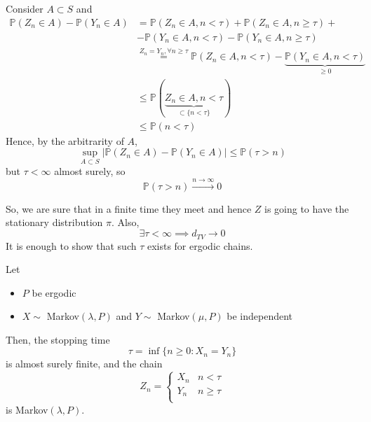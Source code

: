 \documentclass{article}
\begin{document}
	\begin{proof2}
		Consider $A \subset S$ and 
		\begin{align*}
			\mathbb{P}(Z_n \in A) - \mathbb{P}(Y_n \in A) &= \mathbb{P}(Z_n \in A, n < \tau) + \mathbb{P}(Z_n \in A, n \geq \tau) +\\
			&- \mathbb{P}(Y_n \in A, n < \tau) - \mathbb{P}(Y_n \in A, n \geq \tau) \\
			&\stackrel{Z_n = Y_n, \forall n \geq \tau}= \mathbb{P}(Z_n \in A, n < \tau)- \underbrace{\mathbb{P}(Y_n \in A, n < \tau)}_{\geq 0} \\
			&\leq \mathbb{P}(\underbrace{Z_n \in A, n < \tau}_{\subset \{n < \tau\}})\\
			&\leq \mathbb{P}(n < \tau)
		\end{align*}
		Hence, by the arbitrarity of $A$,
		\begin{equation*}
			\sup_{A \subset S} |\mathbb{P}(Z_n \in A) - \mathbb{P}(Y_n \in A)| \leq \mathbb{P}(\tau > n)
		\end{equation*}
		but $\tau < \infty$ almost surely, so
		\begin{equation*}
			\mathbb{P}(\tau > n) \xrightarrow{n \rightarrow \infty} 0
		\end{equation*}
	\end{proof2}
	So, we are sure that in a finite time they meet and hence $Z$ is going to have the stationary distribution $\pi$. Also, 
	\begin{equation*}
		\exists \tau < \infty \implies d_{TV} \rightarrow 0
	\end{equation*}
	It is enough to show that such $\tau$ exists for ergodic chains. 
	\begin{theorem}
		Let 
		\begin{itemize}
			\item $P$ be ergodic 
			\item $X \sim$ Markov$(\lambda, P)$ and $Y \sim $ Markov$(\mu, P)$ be independent 
		\end{itemize}
		Then, the stopping time 
		\begin{equation*}
			\tau = \inf\{n \geq 0: X_n = Y_n\}
		\end{equation*}
		is almost surely finite, and the chain
		\[
		Z_n =   
		\begin{cases}
			X_n & n<\tau \\
			Y_n & n \geq \tau \\
		\end{cases}
		\]
		is Markov$(\lambda, P)$.
	\end{theorem}
\end{document}
